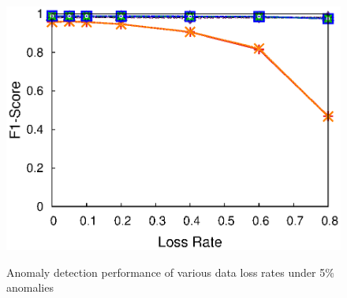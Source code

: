{\begin{figure}[h!]
{    \includegraphics[width=\figurewidthI]{fig/dect.PureRandLoss.srmf_based_pred.tm_multi_loc_rssi.txt.500.895.1.500.r32.period1.org.2d.elem.ind.elem1.burst1.na0.05.anom3.noise0.thresh-1.eps}
  }
  \vspace{-0.2in}
  \caption{Anomaly detection performance of various data loss rates
    under 5\% anomalies}
  \vspace{-0.15in}
  \label{fig:pure-rand-detection}
\end{figure}
}

